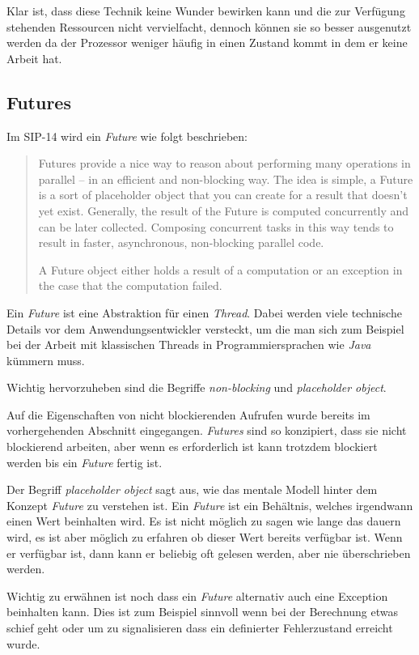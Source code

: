 Klar ist, dass diese Technik keine Wunder bewirken kann und die zur
Verfügung stehenden Ressourcen nicht vervielfacht, dennoch können
sie so besser ausgenutzt werden da der Prozessor weniger häufig
in einen Zustand kommt in dem er keine Arbeit hat.

\subsection{Futures}

Im SIP-14 wird ein \emph{Future} wie folgt beschrieben:
\begin{quote}
Futures provide a nice way to reason about performing many operations in 
parallel – in an efficient and non-blocking way. The idea is simple, a Future 
is a sort of placeholder object that you can create for a result that doesn’t 
yet exist. Generally, the result of the Future is computed concurrently and can 
be later collected. Composing concurrent tasks in this way tends to result in 
faster, asynchronous, non-blocking parallel code.

A Future object either holds a result of a computation or an 
exception in the case that the computation failed.
\end{quote}

Ein \emph{Future} ist eine Abstraktion für einen \emph{Thread}.
Dabei werden viele technische Details vor dem Anwendungsentwickler
versteckt, um die man sich zum Beispiel bei der Arbeit mit klassischen
Threads in Programmiersprachen wie \emph{Java} kümmern muss.

Wichtig hervorzuheben sind die Begriffe \emph{non-blocking} und
\emph{placeholder object}.

Auf die Eigenschaften von nicht blockierenden Aufrufen wurde bereits
im vorhergehenden Abschnitt eingegangen. \emph{Futures} sind so konzipiert,
dass sie nicht blockierend arbeiten, aber wenn es erforderlich ist
kann trotzdem blockiert werden bis ein \emph{Future} fertig ist.

Der Begriff \emph{placeholder object} sagt aus, wie das mentale
Modell hinter dem Konzept \emph{Future} zu verstehen ist. Ein
\emph{Future} ist ein Behältnis, welches irgendwann einen Wert
beinhalten wird. Es ist nicht möglich zu sagen wie lange das dauern
wird, es ist aber möglich zu erfahren ob dieser Wert bereits
verfügbar ist. Wenn er verfügbar ist, dann kann er beliebig oft
gelesen werden, aber nie überschrieben werden.

Wichtig zu erwähnen ist noch dass ein \emph{Future} alternativ
auch eine Exception beinhalten kann. Dies ist zum Beispiel sinnvoll
wenn bei der Berechnung etwas schief geht oder um zu signalisieren
dass ein definierter Fehlerzustand erreicht wurde.

